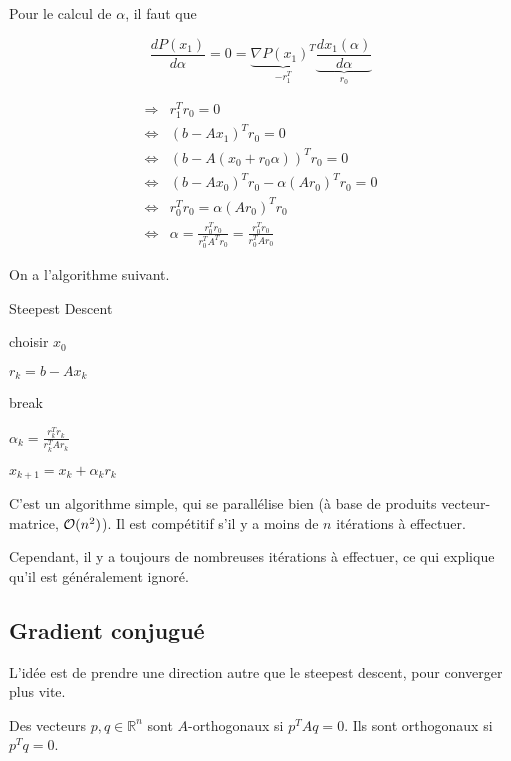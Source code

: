 	Pour le calcul de $\alpha$, il faut que
	
	$$\frac{dP(x_1)}{d\alpha} = 0 = \underbrace{\nabla P(x_1)^T}_{-r_1^T}  \underbrace{\frac{d x_1(\alpha )}{d \alpha }}_{r_0}$$
	
	\begin{eqnarray}
	\Rightarrow 	& r_1^Tr_0 		 =  0 \\
	\Leftrightarrow & (b - Ax_1)^Tr_0  =  0 \\
	\Leftrightarrow & (b - A(x_0 + r_0 \alpha))^Tr_0  =  0 \\
	\Leftrightarrow & (b - Ax_0)^Tr_0 - \alpha(Ar_0)^Tr_0  =  0 \\
	\Leftrightarrow & r_0^Tr_0  =  \alpha(Ar_0)^Tr_0 \\
	\Leftrightarrow & \alpha  =  \frac{r_0^Tr_0}{r_0^TA^Tr_0} = \frac{r_0^T r_0}{r_0^T A r_0}
	\end{eqnarray}

	On a l'algorithme suivant.
	
\begin{algorithm}
\caption{Steepest Descent}
\begin{algorithmic}

\STATE choisir $x_0$


	\STATE $r_k = b - A x_k$
	
		\STATE break
	\ENDIF
	
	\STATE $\alpha_k = \frac{r_k^T r_k}{r_k^T A r_k}$
	
	\STATE $x_{k + 1} = x_k + \alpha_k r_k$
\ENDFOR
\end{algorithmic}
\end{algorithm}	


	C'est un algorithme simple, qui se parallélise bien (à base de produits vecteur-matrice, $\mathcal{O}(n^2)$). Il est compétitif s'il y a moins de $n$ itérations à effectuer.
	
	Cependant, il y a toujours de nombreuses itérations à effectuer, ce qui explique qu'il est généralement ignoré.
	
	\subsection{Gradient conjugué}
	
	L'idée est de prendre une direction autre que le steepest descent, pour converger plus vite.
	
	\begin{definition}
	
	Des vecteurs $p, q \in \mathbb{R}^n$ sont $A$-orthogonaux si $p^TAq = 0$. Ils sont orthogonaux si $p^Tq = 0$.
	\end{definition}
	
